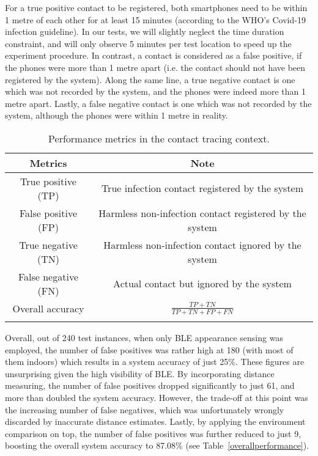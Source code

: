 \documentclass[graybox]{svmult}
\begin{document}
For a true positive contact to be registered, both smartphones need to be within 1 metre of each other for at least 15 minutes (according to the WHO's Covid-19 infection guideline). In our tests, we will slightly neglect the time duration constraint, and will only observe 5 minutes per test location to speed up the experiment procedure. In contrast, a contact is considered as a false positive, if the phones were more than 1 metre apart (i.e. the contact should not have been registered by the system). Along the same line, a true negative contact is one which was not recorded by the system, and the phones were indeed more than 1 metre apart. Lastly, a false negative contact is one which was not recorded by the system, although the phones were within 1 metre in reality.
\begin{table}[h]
	\caption{Performance metrics in the contact tracing context.}
	\centering
	\begin{tabular}{c c}
		\toprule
		\textbf{Metrics} & \textbf{Note} \\
		\midrule
		True positive (TP) & True infection contact registered by the system \\ \addlinespace[0.2cm]
		False positive (FP) & Harmless non-infection contact registered by the system \\ \addlinespace[0.2cm]
		True negative (TN) & Harmless non-infection contact ignored by the system \\ \addlinespace[0.2cm]
		False negative (FN) & Actual contact but ignored by the system \\ \addlinespace[0.2cm]
		Overall accuracy & $\frac{TP + TN}{TP + TN + FP + FN}$ \\ \addlinespace[0.2cm]
		\bottomrule
	\end{tabular}
	\label{metrics}
\end{table}

Overall, out of 240 test instances, when only BLE appearance sensing was employed, the number of false positives was rather high at 180 (with most of them indoors) which results in a system accuracy of just 25\%. These figures are unsurprising given the high visibility of BLE. By incorporating distance measuring, the number of false positives dropped significantly to just 61, and more than doubled the system accuracy. However, the trade-off at this point was the increasing number of false negatives, which was unfortunately wrongly discarded by inaccurate distance estimates. Lastly, by applying the environment comparison on top, the number of false positives was further reduced to just 9, boosting the overall system accuracy to 87.08\% (see Table~\ref{overallperformance}).
\end{document}
